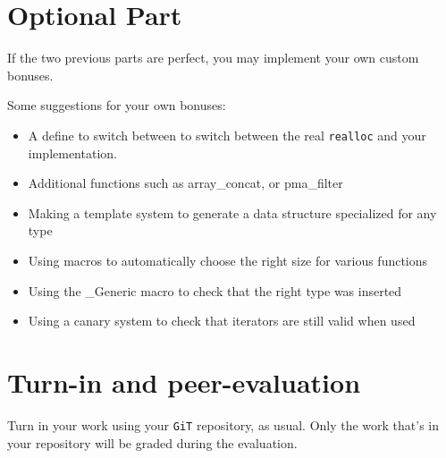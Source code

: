 \documentclass{42-en}
\begin{document}




\chapter{Optional Part}

    If the two previous parts are perfect, you may implement your own custom
    bonuses.

    Some suggestions for your own bonuses:
    \begin{itemize}\itemsep7pt
        \item A define to switch between to switch between the real \texttt{realloc} and your implementation.
        \item Additional functions such as array\_concat, or pma\_filter
        \item Making a template system to generate a data structure specialized for any type
        \item Using macros to automatically choose the right size for various functions
        \item Using the \_Generic macro to check that the right type was inserted
        \item Using a canary system to check that iterators are still valid when used
    \end{itemize}

\chapter{Turn-in and peer-evaluation}

    Turn in your work using your \texttt{GiT} repository, as
    usual. Only the work that's in your repository will be graded during
    the evaluation.



\end{document}
